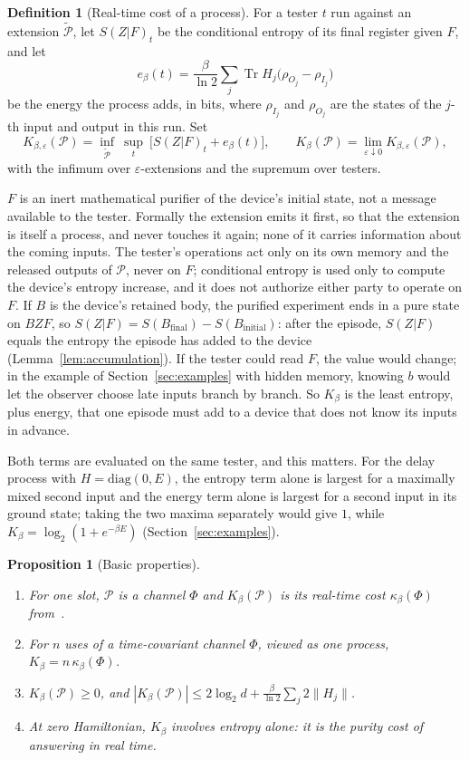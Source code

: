 \documentclass[11pt]{article}
\newtheorem{proposition}[theorem]{Proposition}
\theoremstyle{definition}
\newtheorem{definition}{Definition}
\theoremstyle{remark}
\newcommand{\Tr}{\operatorname{Tr}}
\newcommand{\Kb}{K_\beta}
\newcommand{\Trt}{\kappa_\beta}
\newcommand{\Pp}{\mathcal P}
\newcommand{\Pt}{\widetilde{\mathcal P}}
\begin{document}
\begin{definition}[Real-time cost of a process]\label{def:cost}
For a tester $t$ run against an extension $\Pt$, let $S(Z|F)_t$ be the conditional entropy of its final register given $F$, and let
\[
e_\beta(t)=\frac{\beta}{\ln2}\sum_j\Tr H_j\bigl(\rho_{O_j}-\rho_{I_j}\bigr)
\]
be the energy the process adds, in bits, where $\rho_{I_j}$ and $\rho_{O_j}$ are the states of the $j$-th input and output in this run. Set
\[
K_{\beta,\varepsilon}(\Pp)=\inf_{\Pt}\ \sup_t\ \bigl[S(Z|F)_t+e_\beta(t)\bigr],\qquad \Kb(\Pp)=\lim_{\varepsilon\downarrow0}K_{\beta,\varepsilon}(\Pp),
\]
with the infimum over $\varepsilon$-extensions and the supremum over testers.
\end{definition}

$F$ is an inert mathematical purifier of the device's initial state, not a message available to the tester. Formally the extension emits it first, so that the extension is itself a process, and never touches it again; none of it carries information about the coming inputs. The tester's operations act only on its own memory and the released outputs of $\Pp$, never on $F$; conditional entropy is used only to compute the device's entropy increase, and it does not authorize either party to operate on $F$. If $B$ is the device's retained body, the purified experiment ends in a pure state on $BZF$, so $S(Z|F)=S(B_{\mathrm{final}})-S(B_{\mathrm{initial}})$: after the episode, $S(Z|F)$ equals the entropy the episode has added to the device (Lemma~\ref{lem:accumulation}). If the tester could read $F$, the value would change; in the example of Section~\ref{sec:examples} with hidden memory, knowing $b$ would let the observer choose late inputs branch by branch. So $\Kb$ is the least entropy, plus energy, that one episode must add to a device that does not know its inputs in advance.

Both terms are evaluated on the same tester, and this matters. For the delay process with $H=\mathrm{diag}(0,E)$, the entropy term alone is largest for a maximally mixed second input and the energy term alone is largest for a second input in its ground state; taking the two maxima separately would give $1$, while $\Kb=\log_2(1+e^{-\beta E})$ (Section~\ref{sec:examples}).

\begin{proposition}[Basic properties]\label{prop:basic}
\begin{enumerate}[label=(\alph*)]
\item For one slot, $\Pp$ is a channel $\Phi$ and $\Kb(\Pp)$ is its real-time cost $\Trt(\Phi)$ from~\cite{SaveWork}.
\item For $n$ uses of a time-covariant channel $\Phi$, viewed as one process, $\Kb=n\,\Trt(\Phi)$.
\item $\Kb(\Pp)\ge0$, and $|\Kb(\Pp)|\le2\log_2d+\frac{\beta}{\ln2}\sum_j2\|H_j\|$.
\item At zero Hamiltonian, $\Kb$ involves entropy alone: it is the purity cost of answering in real time.
\end{enumerate}
\end{proposition}
\end{document}
